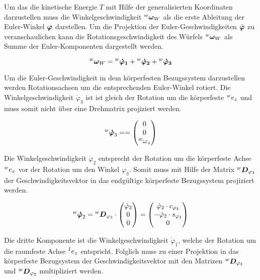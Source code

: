 Um das die kinetische Energie $T$ mit Hilfe der generalisierten Koordinaten darzustellen muss die Winkelgeschwindigkeit $\prescript{w}{}{}\boldsymbol{\omega}_W$ als die erste Ableitung der Euler-Winkel $\boldsymbol{\varphi}$ darstellen.
Um die Projektion der Euler-Geschwindigkeiten $\dot{\boldsymbol{\varphi}}$ zu veranschaulichen kann die Rotationsgeschwindigkeit des Würfels $\prescript{w}{}{}\boldsymbol{\omega}_W$ als Summe der Euler-Komponenten dargestellt werden.

\begin{equation}
\prescript{w}{}{}\boldsymbol{\omega}_W = \prescript{w}{}{}\boldsymbol{\dot{\varphi}_1} + \prescript{w}{}{}\boldsymbol{\dot{\varphi}_2} + \prescript{w}{}{}\boldsymbol{\dot{\varphi}_3}
\end{equation}

Um die Euler-Geschwindigkeit in dem körperfesten Bezugssystem darzustellen werden Rotationsachsen um die entsprechenden Euler-Winkel rotiert. Die Winkelgeschwindigkeit $\dot{\varphi}_3$ ist ist gleich der Rotation um die körperfeste $\prescript{w}{} e_z$ und muss somit nicht über eine Drehmatrix projiziert werden. 

\begin{equation}
\prescript{w}{}{}\boldsymbol{\dot{\varphi}}_3 =  =
\begin{pmatrix}
0 \\ 0 \\ \prescript{w}{}{\omega}_z
\end{pmatrix} 
\end{equation}

Die Winkelgeschwindigkeit $\dot{\varphi}_2$ entsprecht der Rotation um die körperfeste Achse $\prescript{w}{} e_x$ vor der Rotation um den Winkel $\varphi_3$. Somit muss mit Hilfe der  Matrix $\prescript{w}{}{}\boldsymbol{D}_{\varphi_3}$ der Geschwindigkeitsvektor in das endgültige körperfeste Bezugssystem projiziert werden.

\begin{equation}
\prescript{w}{}{}\boldsymbol{\dot{\varphi}}_2 = \prescript{w}{}{}\boldsymbol{D}_{\varphi_3} \cdot
\begin{pmatrix}
\dot{\varphi}_2 \\ 0 \\ 0
\end{pmatrix} = 
\begin{pmatrix}
\dot{\varphi}_2 \cdot c_{\varphi_3} \\
-\dot{\varphi}_2 \cdot s_{\varphi_3} \\
0
\end{pmatrix}
\end{equation}

Die dritte Komponente ist die Winkelgeschwindigkeit $\dot{\varphi}_1$, welche der Rotation um die raumfeste Achse $\prescript{I}{} e_z$ entspricht. Folglich muss zu einer Projektion in das körperfeste Bezugsystem der Geschwindigkeitsvektor mit den Matrizen $\prescript{w}{}{}\boldsymbol{D}_{\varphi_3}$ und $\prescript{w}{}{}\boldsymbol{D}_{\varphi_2}$ multipliziert werden. 

